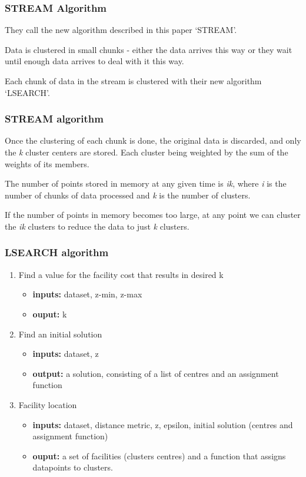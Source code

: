 \documentclass{beamer}
\begin{document}
\frame
{
  \frametitle{STREAM Algorithm}

  They call the new algorithm described in this paper `STREAM'.

  \bigskip
  Data is clustered in small chunks - either the data
  arrives this way or they wait until enough data arrives to deal with
  it this way.

  \bigskip
  Each chunk of data in the stream is clustered with their new
  algorithm `LSEARCH'.

}



\frame
{
  \frametitle{STREAM algorithm}


 Once the clustering of each chunk is done, the original data is
 discarded, and only the {\em k} cluster centers are stored. Each
 cluster being weighted by the sum of the weights of its members.

 \bigskip
 The number of points stored in memory at any given time is {\em ik},
 where {\em i} is the number of chunks of data processed and {\em k}
 is the number of clusters.

 \bigskip
 If the number of points in memory becomes too large, at any point we
 can cluster the {\em ik} clusters to reduce the data to just {\em k}
 clusters.

}


\frame
    {
      \frametitle{LSEARCH algorithm}
      \begin{enumerate}
      \item Find a value for the facility cost that results in desired k
        \begin{itemize}
        \item {\bf inputs:} dataset, z-min, z-max
        \item {\bf ouput:} k
        \end{itemize}

      \item Find an initial solution
        \begin{itemize}
        \item {\bf inputs:} dataset, z
        \item {\bf output:} a solution, consisting of a list of
          centres and an assignment function
        \end{itemize}
        
      \item Facility location
        \begin{itemize}
        \item {\bf inputs:} dataset, distance metric, z, epsilon, initial solution (centres
        and assignment function)
        \item {\bf ouput:} a set of facilities (clusters centres) and a function
          that assigns datapoints to clusters.
        \end{itemize}
   \end{enumerate}
    }
\end{document}
